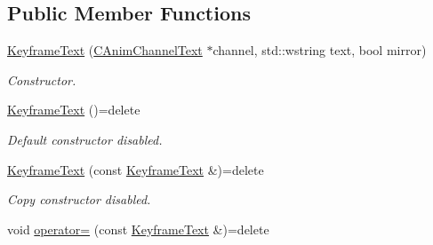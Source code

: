 \subsection*{Public Member Functions}
\begin{DoxyCompactItemize}
\item 
\hyperlink{class_c_anim_channel_text_1_1_keyframe_text_a08c2025f5f3e5b1658f5e644f9da90c7}{Keyframe\+Text} (\hyperlink{class_c_anim_channel_text}{C\+Anim\+Channel\+Text} $\ast$channel, std\+::wstring text, bool mirror)
\begin{DoxyCompactList}\small\item\em Constructor. \end{DoxyCompactList}\item 
\hypertarget{class_c_anim_channel_text_1_1_keyframe_text_a9b020a2026e28bed8b748d7cf10b5c4c}{\hyperlink{class_c_anim_channel_text_1_1_keyframe_text_a9b020a2026e28bed8b748d7cf10b5c4c}{Keyframe\+Text} ()=delete}\label{class_c_anim_channel_text_1_1_keyframe_text_a9b020a2026e28bed8b748d7cf10b5c4c}

\begin{DoxyCompactList}\small\item\em Default constructor disabled. \end{DoxyCompactList}\item 
\hypertarget{class_c_anim_channel_text_1_1_keyframe_text_a364ca7bcbd1c8ff04811653130962a00}{\hyperlink{class_c_anim_channel_text_1_1_keyframe_text_a364ca7bcbd1c8ff04811653130962a00}{Keyframe\+Text} (const \hyperlink{class_c_anim_channel_text_1_1_keyframe_text}{Keyframe\+Text} \&)=delete}\label{class_c_anim_channel_text_1_1_keyframe_text_a364ca7bcbd1c8ff04811653130962a00}

\begin{DoxyCompactList}\small\item\em Copy constructor disabled. \end{DoxyCompactList}\item 
\hypertarget{class_c_anim_channel_text_1_1_keyframe_text_a1acfd06ff4f697cabdb2eac2a5cc43f0}{void \hyperlink{class_c_anim_channel_text_1_1_keyframe_text_a1acfd06ff4f697cabdb2eac2a5cc43f0}{operator=} (const \hyperlink{class_c_anim_channel_text_1_1_keyframe_text}{Keyframe\+Text} \&)=delete}\label{class_c_anim_channel_text_1_1_keyframe_text_a1acfd06ff4f697cabdb2eac2a5cc43f0}


\end{DoxyCompactItemize}
